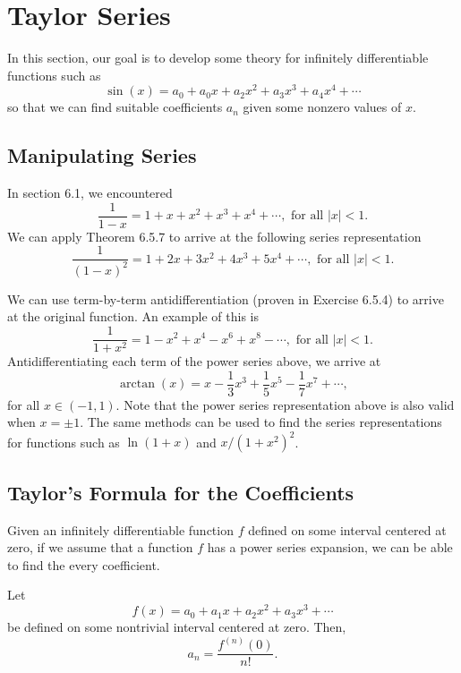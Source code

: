 \section{Taylor Series}

In this section, our goal is to develop some theory for infinitely differentiable functions such as 
    \[  \sin(x) = a_0 + a_{0} x  + a_{2} x^{2} + a_{3} x^{3} + a_{4} x^{4} + \dotsb \]
so that we can find suitable coefficients \( a_{n} \) given some nonzero values of \( x  \).

\subsection{Manipulating Series}
In section 6.1, we encountered 
\[  \frac{ 1 }{ 1-x  } = 1 + x + x^{2} + x^{3} + x^{4} + \dotsb, \text{ for all } | x  | < 1. \tag{1} \]
We can apply Theorem 6.5.7 to arrive at the following series representation
\[  \frac{ 1 }{ (1-x)^2  } = 1 + 2x + 3 x^{2} + 4 x^{3} + 5 x^{4} + \dotsb, \text{ for all } | x  | < 1.   \]

We can use term-by-term antidifferentiation (proven in Exercise 6.5.4) to arrive at the original function. An example of this is 
\[  \frac{ 1 }{ 1 + x^2  }  = 1 - x^{2} + x^{4 } - x^{6 } + x^{8 } - \dotsb, \text{ for all } | x  | < 1. \]
Antidifferentiating each term of the power series above, we arrive at 
\[  \arctan(x) = x - \frac{ 1 }{ 3 }  x^{3} + \frac{ 1 }{ 5 } x^{5} - \frac{ 1 }{ 7 } x^{7} + \dotsb,  \]
for all \( x \in (-1,1) \). Note that the power series representation above is also valid when \( x = \pm 1  \). The same methods can be used to find the series representations for functions such as \( \ln ( 1 + x ) \) and \( x  / (1 + x^2 )^2 \).

\subsection{Taylor's Formula for the Coefficients} 

Given an infinitely differentiable function \( f  \) defined on some interval centered at zero, if we assume that a function \( f  \) has a power series expansion, we can be able to find the every coefficient.

\begin{theorem}
    Let 
    \[  f(x) = a_0 + a_{1}x + a_{2} x^{2} + a_{3} x^{3} + \dotsb \]
    be defined on some nontrivial interval centered at zero. Then, 
    \[ a_n = \frac{ f^{(n)}(0) }{ n! }. \]
    \end{theorem}

